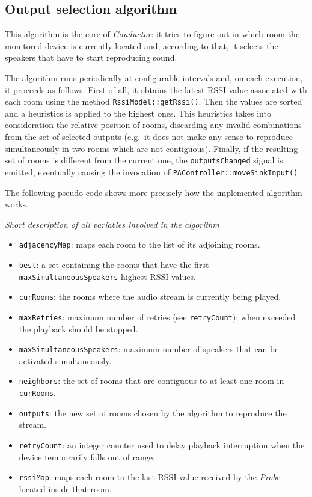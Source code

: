 \documentclass[conference]{IEEEtran}
\newcommand{\Conductor}{\textsl{Conductor}}
\newcommand{\Probe}{\textsl{Probe}}
\begin{document}
\subsection{Output selection algorithm}
\label{algo}
This algorithm is the core of \Conductor{}: it tries to figure out in which room the monitored device is currently located and, according to that, it selects the speakers that have to start reproducing sound.

The algorithm runs periodically at configurable intervals and, on each execution, it proceeds as follows. First of all, it obtains the latest RSSI value associated with each room using the method \texttt{RssiModel::getRssi()}. Then the values are sorted and a heuristics is applied to the highest ones. This heuristics takes into consideration the relative position of rooms, discarding any invalid combinations from the set of selected outputs (e.g.\ it does not make any sense to reproduce simultaneously in two rooms which are not contiguous). Finally, if the resulting set of rooms is different from the current one, the \texttt{outputsChanged} signal is emitted, eventually causing the invocation of \texttt{PAController::moveSinkInput()}.

The following pseudo-code shows more precisely how the implemented algorithm works.

\vspace{2mm}
\textit{Short description of all variables involved in the algorithm}
\begin{itemize}
\item \texttt{adjacencyMap}: maps each room to the list of its adjoining rooms.
\item \texttt{best}: a set containing the rooms that have the first \texttt{maxSimultaneousSpeakers} highest RSSI values.
\item \texttt{curRooms}: the rooms where the audio stream is currently being played.
\item \texttt{maxRetries}: maximum number of retries (see \texttt{retryCount}); when exceeded the playback should be stopped.
\item \texttt{maxSimultaneousSpeakers}: maximum number of speakers that can be activated simultaneously.
\item \texttt{neighbors}: the set of rooms that are contiguous to at least one room in \texttt{curRooms}.
\item \texttt{outputs}: the new set of rooms chosen by the algorithm to reproduce the stream.
\item \texttt{retryCount}: an integer counter used to delay playback interruption when the device temporarily falls out of range.
\item \texttt{rssiMap}: maps each room to the last RSSI value received by the \Probe{} located inside that room.
\end{itemize}
\end{document}
